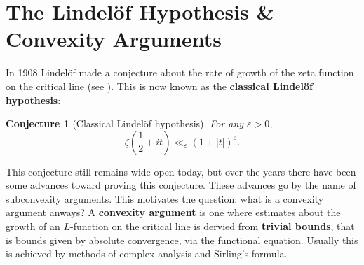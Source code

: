 \documentclass[12pt]{book}
\newtheorem{conjecture}{Conjecture}[section]
\theoremstyle{definition}\newframedtheorem{method}{Method}
\newcommand{\z}{\zeta}
\newcommand{\e}{\varepsilon}
\newcommand{\<}{\langle}
\renewcommand{\>}{\rangle}
\begin{document}
  \section{The Lindel\"of Hypothesis \& Convexity Arguments}
    In 1908 Lindel\"of made a conjecture about the rate of growth of the zeta function on the critical line (see \cite{lindelof1908quelques}). This is now known as the \textbf{classical Lindel\"of hypothesis}:

    \begin{conjecture}[Classical Lindel\"of hypothesis]
      For any $\e > 0$,
      \[
        \z\left(\frac{1}{2}+it\right) \ll_{\e} (1+|t|)^{\e}.
      \]
    \end{conjecture}

    This conjecture still remains wide open today, but over the years there have been some advances toward proving this conjecture. These advances go by the name of subconvexity arguments. This motivates the question: what is a convexity argument anways? A \textbf{convexity argument} is one where estimates about the growth of an $L$-function on the critical line is dervied from \textbf{trivial bounds}, that is bounds given by absolute convergence, via the functional equation. Usually this is achieved by methods of complex analysis and Sirling's formula.
\end{document}
